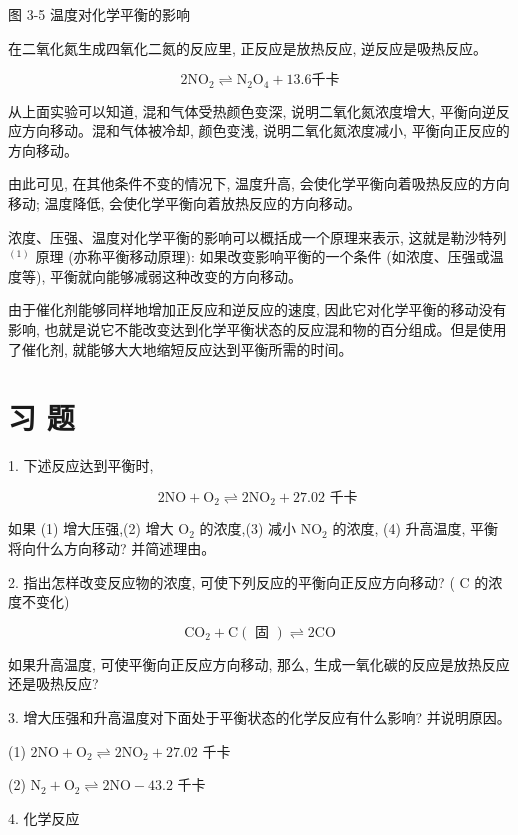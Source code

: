 \documentclass[10pt]{article}
\begin{document}
图 3-5 温度对化学平衡的影响

在二氧化氮生成四氧化二氮的反应里, 正反应是放热反应, 逆反应是吸热反应。

\[
2{\mathrm{{NO}}}_{2} \rightleftharpoons {\mathrm{N}}_{2}{\mathrm{O}}_{4} + {13.6}\text{千卡}
\]

从上面实验可以知道, 混和气体受热颜色变深, 说明二氧化氮浓度增大, 平衡向逆反应方向移动。混和气体被冷却, 颜色变浅, 说明二氧化氮浓度减小, 平衡向正反应的方向移动。

由此可见, 在其他条件不变的情况下, 温度升高, 会使化学平衡向着吸热反应的方向移动; 温度降低, 会使化学平衡向着放热反应的方向移动。

浓度、压强、温度对化学平衡的影响可以概括成一个原理来表示, 这就是勒沙特列 \({}^{\left( 1\right) }\) 原理 (亦称平衡移动原理): 如果改变影响平衡的一个条件 (如浓度、压强或温度等), 平衡就向能够减弱这种改变的方向移动。

由于催化剂能够同样地增加正反应和逆反应的速度, 因此它对化学平衡的移动没有影响, 也就是说它不能改变达到化学平衡状态的反应混和物的百分组成。但是使用了催化剂, 就能够大大地缩短反应达到平衡所需的时间。

\section*{习 题}

1. 下述反应达到平衡时,

\[
2\mathrm{{NO}} + {\mathrm{O}}_{2} \rightleftharpoons 2{\mathrm{{NO}}}_{2} + {27.02}\text{ 千卡 }
\]

如果 (1) 增大压强,(2) 增大 \({\mathrm{O}}_{2}\) 的浓度,(3) 减小 \({\mathrm{{NO}}}_{2}\) 的浓度, (4) 升高温度, 平衡将向什么方向移动? 并简述理由。

2. 指出怎样改变反应物的浓度, 可使下列反应的平衡向正反应方向移动? ( \(\mathrm{C}\) 的浓度不变化)

\[
{\mathrm{{CO}}}_{2} + \mathrm{C}\left( \text{ 固 }\right) \rightleftharpoons 2\mathrm{{CO}}
\]

如果升高温度, 可使平衡向正反应方向移动, 那么, 生成一氧化碳的反应是放热反应还是吸热反应?

3. 增大压强和升高温度对下面处于平衡状态的化学反应有什么影响? 并说明原因。

(1) \(2\mathrm{{NO}} + {\mathrm{O}}_{2} \rightleftharpoons 2{\mathrm{{NO}}}_{2} + {27.02}\) 千卡

(2) \({\mathrm{N}}_{2} + {\mathrm{O}}_{2} \rightleftharpoons 2\mathrm{{NO}} - {43.2}\) 千卡

4. 化学反应
\end{document}
